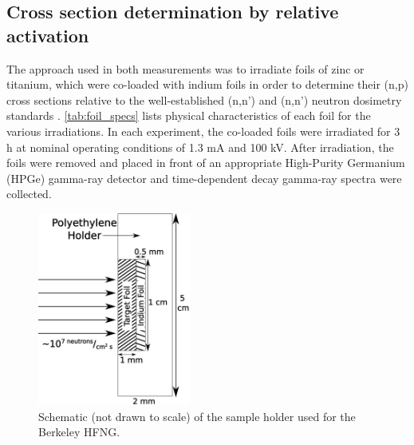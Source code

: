 \subsection{Cross section determination by relative activation}\label{sec:sample_loading}


The approach used in both measurements was to irradiate foils of zinc or titanium, which were co-loaded with indium foils in order to determine their (n,p) cross sections relative to the well-established (n,n') and (n,n') neutron dosimetry standards \cite{Capote2012,zsolnay2012technical}.
  \autoref{tab:foil_specs} lists physical characteristics of each foil for the various irradiations.
In each experiment, the co-loaded foils were irradiated for 3 h at nominal operating conditions of 1.3 mA and 100 kV.
 After irradiation, the foils were removed and placed in front of an appropriate High-Purity Germanium (HPGe) gamma-ray detector and time-dependent decay gamma-ray spectra were collected.
  



\begin{figure}
    \centering
        \includegraphics[height=2.5in]{./figures/holder.pdf}
        \caption{Schematic (not drawn to scale) of the sample holder used for the Berkeley HFNG.}
        \label{fig:holder_a}
\end{figure}

